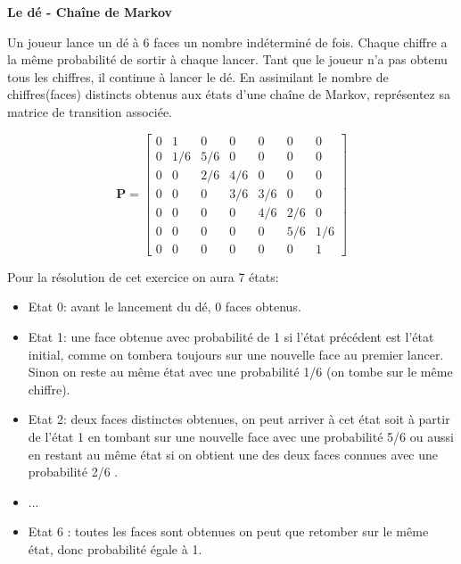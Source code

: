 \begin{Exercice}[10 minutes]\textbf{Le dé - Chaîne de Markov \optionnel}

Un joueur lance un dé à 6 faces un nombre indéterminé de fois. Chaque chiffre a la même probabilité de sortir à chaque lancer. Tant que le joueur n'a pas obtenu tous les chiffres, il continue à lancer le dé. 
En assimilant le nombre de chiffres(faces) distincts obtenus aux états d'une chaîne de Markov, représentez sa matrice de transition associée.


	 \begin{solution}

	\[ 
		\mathbf{P} =
		\begin{bmatrix}
		0 & 1 & 0 & 0 & 0 & 0 & 0  \\
		0 & 1/6 & 5/6 & 0 & 0 & 0 & 0  \\
		0 & 0 & 2/6 & 4/6 & 0 & 0 & 0  \\
		0 & 0 & 0 & 3/6 & 3/6 & 0 & 0  \\
		0 & 0 & 0 & 0 & 4/6 & 2/6 & 0  \\
		0 & 0 & 0 & 0 & 0 & 5/6 & 1/6  \\
		0 & 0 & 0 & 0 & 0 & 0 & 1 
		\end{bmatrix}
	\]
	 \end{solution}

    Pour la résolution de cet exercice on aura 7 états: 
    \begin{itemize}
        \item Etat 0: avant le lancement du dé, 0 faces obtenus.
        \item Etat 1: une face obtenue avec probabilité de 1 si l'état précédent est l'état initial, comme on tombera toujours sur une nouvelle face au premier lancer. 
        Sinon on reste au même état avec une probabilité 1/6 (on tombe sur le même chiffre).
        \item Etat 2: deux faces distinctes obtenues, on peut arriver à cet état soit à partir de l'état 1 en tombant sur une nouvelle 
        face avec une probabilité 5/6 ou aussi en restant au même état si on obtient une des deux faces connues avec une probabilité 2/6 . 
        \item ...
        \item Etat 6 : toutes les faces sont obtenues on peut que retomber sur le même état, donc probabilité égale à 1. 
    \end{itemize}
    
    

\end{Exercice}




